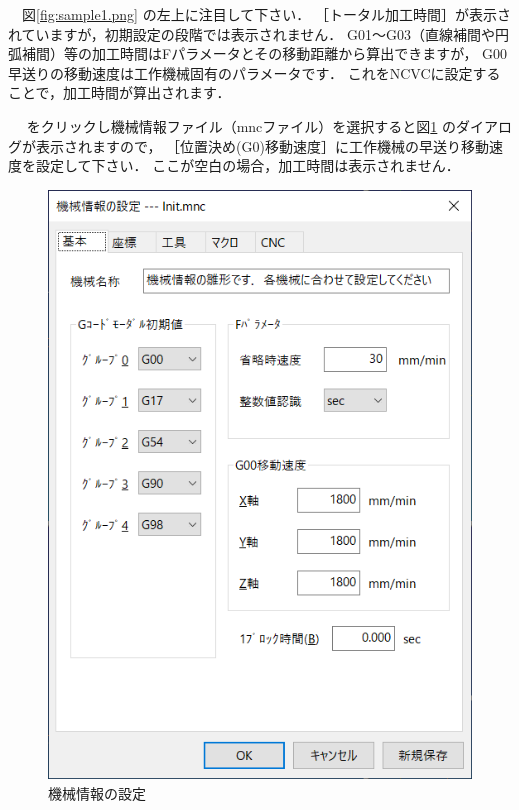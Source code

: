 \begin{minipage}[t]{0.5\textwidth}
　図\ref{fig:sample1.png} の左上に注目して下さい．
［トータル加工時間］が表示されていますが，初期設定の段階では表示されません．
G01～G03（直線補間や円弧補間）等の加工時間はFパラメータとその移動距離から算出できますが，
G00早送りの移動速度は工作機械固有のパラメータです．
これをNCVCに設定することで，加工時間が算出されます．

　 をクリックし機械情報ファイル（mncファイル）を選択すると図\ref{fig:kikai.png} のダイアログが表示されますので，
［位置決め(G0)移動速度］に工作機械の早送り移動速度を設定して下さい．
ここが空白の場合，加工時間は表示されません．
\end{minipage}
\begin{minipage}[t]{0.5\textwidth}
\vspace*{-2zh}
\begin{figure}[H]
\centering
\includegraphics[scale=0.7]{No2/fig/kikai.png}
\caption{機械情報の設定}
\label{fig:kikai.png}
\end{figure}
\end{minipage}

